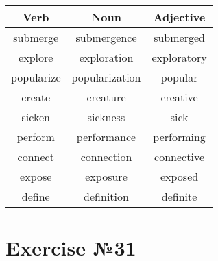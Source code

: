 \begin{table}[h!]
      \centering
      \begin{tabular}{|c|c|c|}
            \hline
            \textbf{Verb} & \textbf{Noun}  & \textbf{Adjective} \\
            \hline
            submerge      & submergence    & submerged          \\
            explore       & exploration    & exploratory        \\
            popularize    & popularization & popular            \\
            create        & creature       & creative           \\
            sicken        & sickness       & sick               \\
            perform       & performance    & performing         \\
            connect       & connection     & connective         \\
            expose        & exposure       & exposed            \\
            define        & definition     & definite           \\
            \hline
      \end{tabular}
\end{table}

\newpage

\section{Exercise №31}
